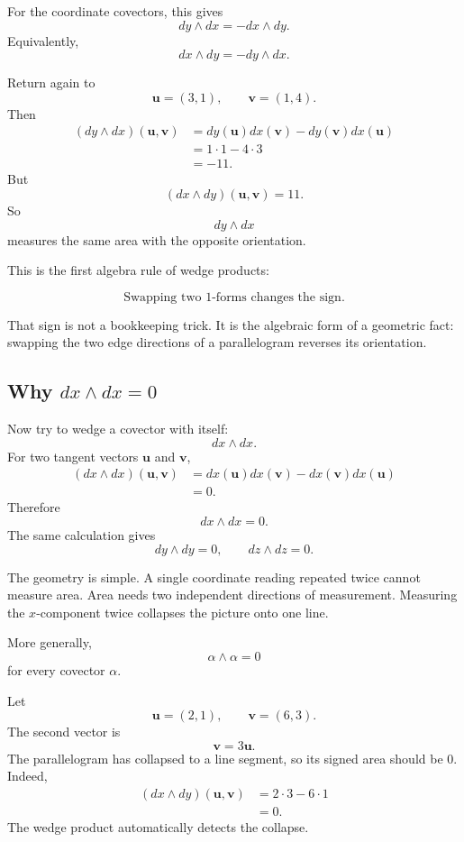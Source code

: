 For the coordinate covectors, this gives
\[
\boxed{
    dy\wedge dx=-dx\wedge dy.
}
\]
Equivalently,
\[
\boxed{
    dx\wedge dy=-dy\wedge dx.
}
\]

\begin{example}
Return again to
\[
    \mathbf u=(3,1),
    \qquad
    \mathbf v=(1,4).
\]
Then
\[
\begin{aligned}
    (dy\wedge dx)(\mathbf u,\mathbf v)
    &=
    dy(\mathbf u)dx(\mathbf v)-dy(\mathbf v)dx(\mathbf u)\\
    &=
    1\cdot1-4\cdot3\\
    &=
    -11.
\end{aligned}
\]
But
\[
    (dx\wedge dy)(\mathbf u,\mathbf v)=11.
\]
So
\[
    dy\wedge dx
\]
measures the same area with the opposite orientation.
\end{example}

This is the first algebra rule of wedge products:

\[
\boxed{
    \text{Swapping two \(1\)-forms changes the sign.}
}
\]

That sign is not a bookkeeping trick.  It is the algebraic form of a geometric fact:
swapping the two edge directions of a parallelogram reverses its orientation.

\subsection{\texorpdfstring{Why \(dx\wedge dx=0\)}{Why dx wedge dx = 0}}

Now try to wedge a covector with itself:
\[
    dx\wedge dx.
\]
For two tangent vectors \(\mathbf u\) and \(\mathbf v\),
\[
\begin{aligned}
    (dx\wedge dx)(\mathbf u,\mathbf v)
    &=
    dx(\mathbf u)dx(\mathbf v)
    -
    dx(\mathbf v)dx(\mathbf u)\\
    &=
    0.
\end{aligned}
\]
Therefore
\[
\boxed{
    dx\wedge dx=0.
}
\]
The same calculation gives
\[
\boxed{
    dy\wedge dy=0,
    \qquad
    dz\wedge dz=0.
}
\]

The geometry is simple.  A single coordinate reading repeated twice cannot measure
area.  Area needs two independent directions of measurement.  Measuring the
\(x\)-component twice collapses the picture onto one line.

More generally,
\[
\boxed{
    \alpha\wedge\alpha=0
}
\]
for every covector \(\alpha\).

\begin{example}
Let
\[
    \mathbf u=(2,1),
    \qquad
    \mathbf v=(6,3).
\]
The second vector is
\[
    \mathbf v=3\mathbf u.
\]
The parallelogram has collapsed to a line segment, so its signed area should be \(0\).
Indeed,
\[
\begin{aligned}
    (dx\wedge dy)(\mathbf u,\mathbf v)
    &=
    2\cdot3-6\cdot1\\
    &=
    0.
\end{aligned}
\]
The wedge product automatically detects the collapse.
\end{example}

